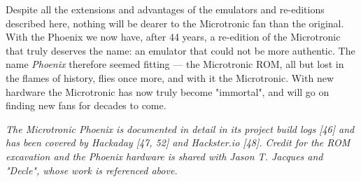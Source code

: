 \documentclass[
  11pt,
  letterpaper,
]{article}
\begin{document}
Despite all the extensions and advantages of the emulators and
re-editions described here, nothing will be dearer to the Microtronic
fan than the original. With the Phoenix we now have, after 44 years, a
re-edition of the Microtronic that truly deserves the name: an emulator
that could not be more authentic. The name \emph{Phoenix} therefore
seemed fitting --- the Microtronic ROM, all but lost in the flames of
history, flies once more, and with it the Microtronic. With new hardware
the Microtronic has now truly become "immortal", and will go on finding
new fans for decades to come.

\emph{The Microtronic Phoenix is documented in detail in its project
build logs {[}46{]} and has been covered by Hackaday {[}47, 52{]} and
Hackster.io {[}48{]}. Credit for the ROM excavation and the Phoenix
hardware is shared with Jason T. Jacques and "Decle", whose work is
referenced above.}
\end{document}
